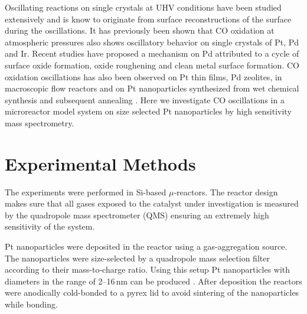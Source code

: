 \documentclass[8.5pt,twoside,twocolumn]{article}
\begin{document}
Oscillating reactions on single crystals at UHV conditions have been studied extensively and is know to originate from surface reconstructions of the surface during the oscillations\cite{Ertl2008}. It has previously been shown\cite{SALES1982} that CO oxidation at atmospheric pressures also shows oscillatory behavior on single crystals of Pt, Pd and Ir. Recent studies have proposed a mechanism on Pd \cite{Hendriksen2010} attributed to a cycle of surface oxide formation, oxide roughening and clean metal surface formation. CO oxidation oscillations has also been observed on Pt thin films\cite{Lund2000}, Pd zeolites\cite{Liauw1996,Slinko2001}, in macroscopic flow reactors\cite{Singh2010} and on Pt nanoparticles synthesized from wet chemical synthesis and subsequent annealing \cite{Carlsson2006}. Here we investigate CO oscillations in a microreactor model system on size selected Pt nanoparticles by high sensitivity mass spectrometry.

\section{Experimental Methods}
The experiments were performed in Si-based $\mu$-reactors\cite{Henriksen2009}. The reactor design makes sure that all gases exposed to the catalyst under investigation is measured by the quadropole mass spectrometer (QMS) ensuring an extremely high sensitivity of the system. 

Pt nanoparticles were deposited in the reactor using a gas-aggregation source. The nanoparticles were size-selected by a quadropole mass selection filter according to their mass-to-charge ratio. Using this setup Pt nanoparticles with diameters in the range of 2--16\,nm can be produced \cite{Nielsen2009}. After deposition the reactors were anodically cold-bonded \cite{Vesborg2010} to a pyrex lid to avoid sintering of the nanoparticles while bonding.
\end{document}
